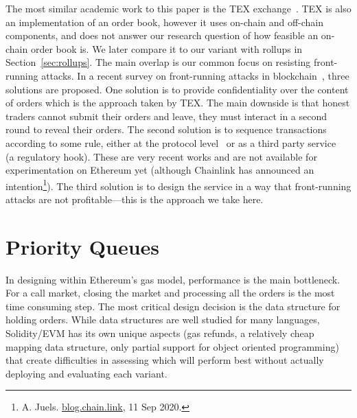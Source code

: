 The most similar academic work to this paper is the TEX exchange~\cite{khalil2019tex}. TEX is also an implementation of an order book, however it uses on-chain and off-chain components, and does not answer our research question of how feasible an on-chain order book is. We later compare it to our variant with rollups in Section~\ref{sec:rollups}. The main overlap is our common focus on resisting front-running attacks. In a recent survey on front-running attacks in blockchain~\cite{eskandari2019sok}, three solutions are proposed. One solution is to provide confidentiality over the content of orders which is the approach taken by TEX. The main downside is that honest traders cannot submit their orders and leave, they must interact in a second round to reveal their orders. The second solution is to sequence transactions according to some rule, either at the protocol level~\cite{MZGA20} or as a third party service~\cite{Kla20} (a regulatory hook). These are very recent works and are not available for experimentation on Ethereum yet (although Chainlink has announced an intention\footnote{A. Juels. \href{https://blog.chain.link/chainlink-fair-sequencing-services-enabling-a-provably-fair-defi-ecosystem/}{blog.chain.link}, 11 Sep 2020.}). The third solution is to design the service in a way that front-running attacks are not profitable---this is the approach we take here. 



\section{Priority Queues}\label{sec:pq}



In designing \cm within Ethereum's gas model, performance is the main bottleneck. For a call market, closing the market and processing all the orders is the most time consuming step. The most critical design decision is the data structure for holding orders. While data structures are well studied for many languages, Solidity/EVM has its own unique aspects (\eg gas refunds, a relatively cheap mapping data structure, only partial support for object oriented programming) that create difficulties in assessing which will perform best without actually deploying and evaluating each variant. 

